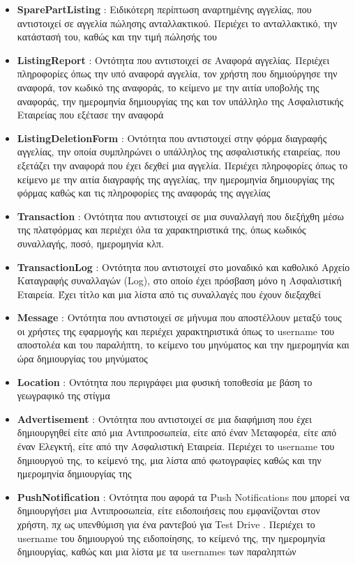 \documentclass{../ol-softwaremanual}
\begin{document}
\begin{itemize}
		\item \en \textbf{SparePartListing} \gr : Ειδικότερη περίπτωση αναρτημένης αγγελίας, που αντιστοιχεί σε αγγελία πώλησης ανταλλακτικού. Περιέχει το ανταλλακτικό, την κατάστασή του, καθώς και την τιμή πώλησής του
		\item \en \textbf{ListingReport} \gr : Οντότητα που αντιστοιχεί σε Αναφορά αγγελίας. Περιέχει πληροφορίες όπως την υπό αναφορά αγγελία, τον χρήστη που δημιούργησε την αναφορά, τον κωδικό της αναφοράς, το κείμενο με την αιτία υποβολής της αναφοράς, την ημερομηνία δημιουργίας της και τον υπάλληλο της Ασφαλιστικής Εταιρείας που εξέτασε την αναφορά
		\item \en \textbf{ListingDeletionForm} \gr : Οντότητα που αντιστοιχεί στην φόρμα διαγραφής αγγελίας, την οποία συμπληρώνει ο υπάλληλος της ασφαλιστικής εταιρείας, που εξετάζει την αναφορά που έχει δεχθεί μια αγγελία. Περιέχει πληροφορίες όπως το κείμενο με την αιτία διαγραφής της αγγελίας, την ημερομηνία δημιουργίας της φόρμας καθώς και τις πληροφορίες της αναφοράς της αγγελίας			
		\item \en \textbf{Transaction} \gr : Οντότητα που αντιστοιχεί σε μια συναλλαγή που διεξήχθη μέσω της πλατφόρμας και περιέχει όλα τα χαρακτηριστικά της, όπως κωδικός συναλλαγής, ποσό, ημερομηνία κλπ.
		\item \en \textbf{TransactionLog} \gr : Οντότητα που αντιστοιχεί στο μοναδικό και καθολικό Αρχείο Καταγραφής συναλλαγών (\en Log\gr), στο οποίο έχει πρόσβαση μόνο η Ασφαλιστική Εταιρεία. Έχει τίτλο και μια λίστα από τις συναλλαγές που έχουν διεξαχθεί
		\item \en \textbf{Message} \gr : Οντότητα που αντιστοιχεί σε μήνυμα που αποστέλλουν μεταξύ τους οι χρήστες της εφαρμογής και περιέχει χαρακτηριστικά όπως το \en username \gr του αποστολέα και του παραλήπτη, το κείμενο του μηνύματος και την ημερομηνία και ώρα δημιουργίας του μηνύματος
		\item \en \textbf{Location} \gr : Οντότητα που περιγράφει μια φυσική τοποθεσία με βάση το γεωγραφικό της στίγμα
		\item \en \textbf{Advertisement} \gr : Οντότητα που αντιστοιχεί σε μια διαφήμιση που έχει δημιουργηθεί είτε από μια Αντιπροσωπεία, είτε από έναν Μεταφορέα, είτε από έναν Ελεγκτή, είτε από την Ασφαλιστική Εταιρεία. Περιέχει το \en username \gr του δημιουργού της, το κείμενό της, μια λίστα από φωτογραφίες καθώς και την ημερομηνία δημιουργίας της
		\item \en \textbf{PushNotification} \gr : Οντότητα που αφορά τα \en Push Notifications \gr που μπορεί να δημιουργήσει μια Αντιπροσωπεία, είτε ειδοποιήσεις που εμφανίζονται στον χρήστη, πχ ως υπενθύμιση για ένα ραντεβού για \en Test Drive \gr. Περιέχει το \en username \gr του δημιουργού της ειδοποίησης, το κείμενό της, την ημερομηνία δημιουργίας, καθώς και μια λίστα με τα \en usernames \gr των παραληπτών

\end{itemize}
\end{document}
